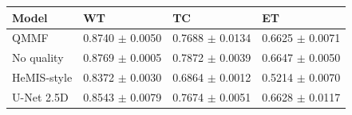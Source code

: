 \begin{tabular}{llll}
\toprule
Model & WT & TC & ET \\
\midrule
QMMF & 0.8740 $\pm$ 0.0050 & 0.7688 $\pm$ 0.0134 & 0.6625 $\pm$ 0.0071 \\
No quality & 0.8769 $\pm$ 0.0005 & 0.7872 $\pm$ 0.0039 & 0.6647 $\pm$ 0.0050 \\
HeMIS-style & 0.8372 $\pm$ 0.0030 & 0.6864 $\pm$ 0.0012 & 0.5214 $\pm$ 0.0070 \\
U-Net 2.5D & 0.8543 $\pm$ 0.0079 & 0.7674 $\pm$ 0.0051 & 0.6628 $\pm$ 0.0117 \\
\bottomrule
\end{tabular}
